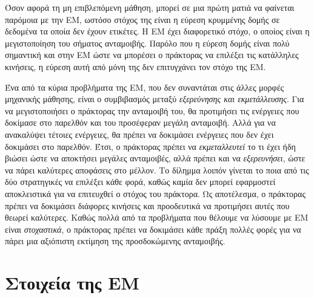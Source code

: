 Όσον αφορά τη μη επιβλεπόμενη μάθηση, μπορεί σε μια πρώτη ματιά να φαίνεται παρόμοια με την ΕΜ, ωστόσο στόχος της
είναι η εύρεση κρυμμένης δομής σε δεδομένα τα οποία δεν έχουν ετικέτες. Η ΕΜ έχει διαφορετικό στόχο, ο οποίος είναι η
μεγιστοποίηση του σήματος ανταμοιβής. Παρόλο που η εύρεση δομής είναι πολύ σημαντική και στην ΕΜ ώστε να μπορέσει ο πράκτορας
να επιλέξει τις κατάλληλες κινήσεις, η εύρεση αυτή από μόνη της δεν επιτυγχάνει τον στόχο της ΕΜ.

Ένα από τα κύρια προβλήματα της ΕΜ, που δεν συναντάται στις άλλες μορφές μηχανικής μάθησης, είναι
ο συμβιβασμός μεταξύ \textit{εξερεύνησης και εκμετάλλευσης}. Για να μεγιστοποιήσει ο πράκτορας την ανταμοιβή του,
θα προτιμήσει τις ενέργειες που δοκίμασε στο παρελθόν και του προσέφεραν μεγάλη ανταμοιβή. Αλλά
για να ανακαλύψει τέτοιες ενέργειες, θα πρέπει να δοκιμάσει ενέργειες που δεν έχει δοκιμάσει στο παρελθόν.
Έτσι, ο πράκτορας πρέπει να \textit{εκμεταλλευτεί} το τι έχει ήδη βιώσει ώστε να αποκτήσει μεγάλες ανταμοιβές,
αλλά πρέπει και να \textit{εξερευνήσει}, ώστε να πάρει καλύτερες αποφάσεις στο μέλλον. Το δίλημμα λοιπόν γίνεται
το ποια από τις δύο στρατηγικές να επιλέξει κάθε φορά, καθώς καμία δεν μπορεί εφαρμοστεί αποκλειστικά για
να επιτευχθεί ο στόχος του πράκτορα. Ως αποτέλεσμα, ο πράκτορας πρέπει να δοκιμάσει διάφορες
κινήσεις και προοδευτικά να προτιμήσει αυτές που θεωρεί καλύτερες. Καθώς πολλά από τα προβλήματα που
θέλουμε να λύσουμε με ΕΜ είναι \textit{στοχαστικά}, ο πράκτορας πρέπει να δοκιμάσει κάθε πράξη πολλές φορές
για να πάρει μια αξιόπιστη εκτίμηση της προσδοκώμενης ανταμοιβής.


\section{Στοιχεία της ΕΜ}

